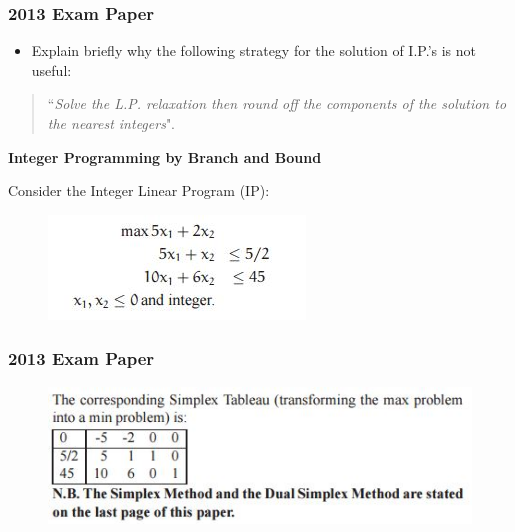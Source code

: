 \documentclass{beamer}
\begin{document}
\begin{frame}
\frametitle{2013 Exam Paper}
\large
\begin{itemize}
\item Explain briefly why the following strategy for the solution of I.P.’s
is not useful:
\end{itemize}
\begin{quote}
``\textit{Solve the L.P. relaxation then round off the components
	of the solution to the nearest integers}".
\end{quote} 
\end{frame}
\begin{frame}
\large
\noindent \textbf{Integer Programming by Branch and Bound} \\
\bigskip

 Consider the Integer Linear Program (IP):

\begin{figure}
\centering
\includegraphics[width=0.7\linewidth]{Exam13-Question}
\end{figure}

%
\end{frame}
\begin{frame}
\frametitle{2013 Exam Paper}
\large
\vspace{-1cm}
\begin{figure}
\centering
\includegraphics[width=1.1\linewidth]{Exam13-0}

\end{figure}

\end{frame}
\end{document}
